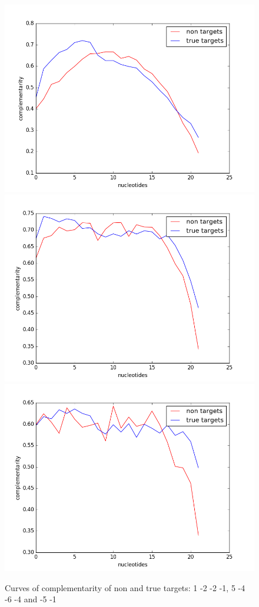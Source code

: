 \documentclass[12pt]{article}
\begin{document}
\begin{figure}[h]
\centering
\includegraphics[scale=0.3]{results/curves1-2-2-1.png}
\includegraphics[scale=0.3]{results/curves5-4-6-4.png}
\includegraphics[scale=0.3]{results/curves-5-1.png}
\caption{Curves of complementarity of non and true targets: 1 -2 -2 -1, 5 -4 -6 -4 and -5 -1}
\label{curves}
\end{figure}
\end{document}
